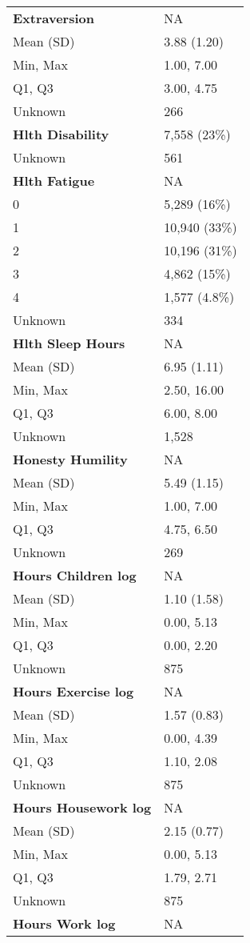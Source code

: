 \documentclass[
  single column]{article}
\begin{document}
\begin{longtable}[]{@{}ll@{}}
\textbf{Extraversion} & NA \\
Mean (SD) & 3.88 (1.20) \\
Min, Max & 1.00, 7.00 \\
Q1, Q3 & 3.00, 4.75 \\
Unknown & 266 \\
\textbf{Hlth Disability} & 7,558 (23\%) \\
Unknown & 561 \\
\textbf{Hlth Fatigue} & NA \\
0 & 5,289 (16\%) \\
1 & 10,940 (33\%) \\
2 & 10,196 (31\%) \\
3 & 4,862 (15\%) \\
4 & 1,577 (4.8\%) \\
Unknown & 334 \\
\textbf{Hlth Sleep Hours} & NA \\
Mean (SD) & 6.95 (1.11) \\
Min, Max & 2.50, 16.00 \\
Q1, Q3 & 6.00, 8.00 \\
Unknown & 1,528 \\
\textbf{Honesty Humility} & NA \\
Mean (SD) & 5.49 (1.15) \\
Min, Max & 1.00, 7.00 \\
Q1, Q3 & 4.75, 6.50 \\
Unknown & 269 \\
\textbf{Hours Children log} & NA \\
Mean (SD) & 1.10 (1.58) \\
Min, Max & 0.00, 5.13 \\
Q1, Q3 & 0.00, 2.20 \\
Unknown & 875 \\
\textbf{Hours Exercise log} & NA \\
Mean (SD) & 1.57 (0.83) \\
Min, Max & 0.00, 4.39 \\
Q1, Q3 & 1.10, 2.08 \\
Unknown & 875 \\
\textbf{Hours Housework log} & NA \\
Mean (SD) & 2.15 (0.77) \\
Min, Max & 0.00, 5.13 \\
Q1, Q3 & 1.79, 2.71 \\
Unknown & 875 \\
\textbf{Hours Work log} & NA \\

\end{longtable}
\end{document}
